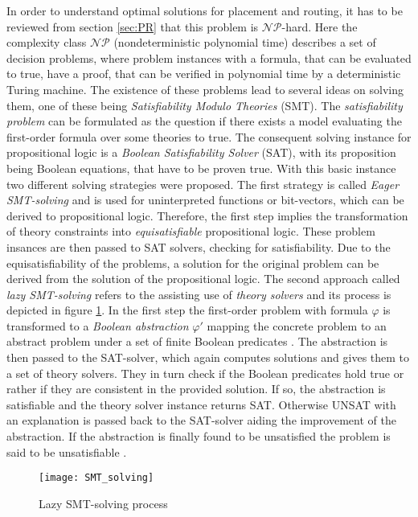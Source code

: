 In order to understand optimal solutions for placement and routing, it has to be reviewed from section \ref{sec:PR} that this problem is $\mathcal{NP}$-hard. Here the complexity class $\mathcal{NP}$ (nondeterministic polynomial time) describes a set of decision problems, where problem instances with a formula, that can be evaluated to true, have a proof, that can be verified in polynomial time by a deterministic Turing machine. The existence of these problems lead to several ideas on solving them, one of these being \textit{Satisfiability Modulo Theories} (SMT). The \textit{satisfiability problem} can be formulated as the question if there exists a model evaluating the first-order formula over some theories to true. The consequent solving instance for propositional logic is a \textit{Boolean Satisfiability Solver} (SAT), with its proposition being Boolean equations, that have to be proven true. With this basic instance two different solving strategies were proposed. The first strategy is called \textit{Eager SMT-solving} and is used for uninterpreted functions or bit-vectors, which can be derived to propositional logic. Therefore, the first step implies the transformation of theory constraints into \textit{equisatisfiable} propositional logic. These problem insances are then passed to SAT solvers, checking for satisfiability. Due to the equisatisfiability of the problems, a solution for the original problem can be derived from the solution of the propositional logic. The second approach called \textit{lazy SMT-solving} refers to the assisting use of \textit{theory solvers} and its process is depicted in figure \ref{fig:SMT_solving}. In the first step the first-order problem with formula $\varphi$ is transformed to a \textit{Boolean abstraction} $\varphi'$ mapping the concrete problem to an abstract problem under a set of finite Boolean predicates \cite{boolean_abstraction}. The abstraction is then passed to the SAT-solver, which again computes solutions and gives them to a set of theory solvers. They in turn check if the Boolean predicates hold true or rather if they are consistent in the provided solution. If so, the abstraction is satisfiable and the theory solver instance returns SAT. Otherwise UNSAT with an explanation is passed back to the SAT-solver aiding the improvement of the abstraction. If the abstraction is finally found to be unsatisfied the problem is said to be unsatisfiable \cite{SMT}.

\begin{figure}
	\centering
	\texttt{[image: SMT\_solving]}
	\caption{Lazy SMT-solving  process \cite{SMT}}\label{fig:SMT_solving}
\end{figure}

